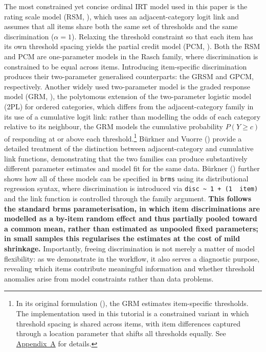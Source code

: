 \documentclass[
  man,
  floatsintext,
  longtable,
  nolmodern,
  notxfonts,
  notimes,
  colorlinks=true,linkcolor=blue,citecolor=blue,urlcolor=blue]{apa7}
\newcommand{\rev}[1]{\textbf{\textcolor{revcol}{#1}}}  %
\begin{document}
The most constrained yet concise ordinal IRT model used in this paper is
the rating scale model (RSM, ), which uses an adjacent-category logit link and assumes that all
items share both the same set of thresholds and the same discrimination
(\(\alpha = 1\)). Relaxing the threshold constraint so that each item
has its own threshold spacing yields the partial credit model (PCM,
). Both the RSM and PCM
are one-parameter models in the Rasch family, where discrimination is
constrained to be equal across items. Introducing item-specific
discrimination produces their two-parameter generalised counterparts:
the GRSM and GPCM, respectively. Another widely used two-parameter model
is the graded response model (GRM,
), the polytomous
extension of the two-parameter logistic model (2PL) for ordered
categories, which differs from the adjacent-category family in its use
of a cumulative logit link: rather than modelling the odds of each
category relative to its neighbour, the GRM models the cumulative
probability \(P(Y \geq c)\) of responding at or above each
threshold.\footnote{In its original formulation
  (), the GRM estimates
  item-specific thresholds. The implementation used in this tutorial is
  a constrained variant in which threshold spacing is shared across
  items, with item differences captured through a location parameter
  that shifts all thresholds equally. See
  \hyperref[apx-models]{Appendix~A} for details.} Bürkner and Vuorre
() provide a detailed treatment of
the distinction between adjacent-category and cumulative link functions,
demonstrating that the two families can produce substantively different
parameter estimates and model fit for the same data. Bürkner
() further shows how all of these
models can be specified in \texttt{brms} using its distributional
regression syntax, where discrimination is introduced via
\texttt{disc\ \textasciitilde{}\ 1\ +\ (1\ \textbar{}\ item)} and the
link function is controlled through the family argument.
\rev{This follows the standard brms parameterisation, in which item discriminations are modelled as a by-item random effect and thus partially pooled toward a common mean, rather than estimated as unpooled fixed parameters; in small samples this regularises the estimates at the cost of mild shrinkage.}
Importantly, freeing discrimination is not merely a matter of model
flexibility: as we demonstrate in the workflow, it also serves a
diagnostic purpose, revealing which items contribute meaningful
information and whether threshold anomalies arise from model constraints
rather than data problems.
\end{document}
